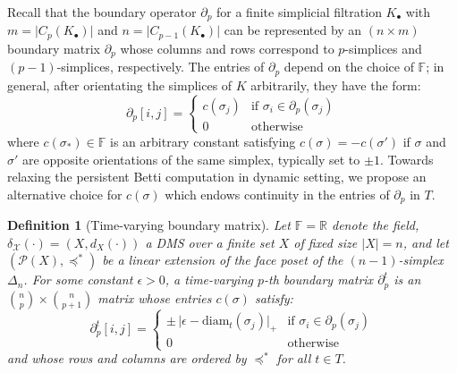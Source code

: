 \documentclass[10pt]{article}
\newtheorem{definition}{Definition}
\begin{document}
Recall that the boundary operator $\partial_p$ for a finite simplicial filtration $K_{\bullet}$ with $m = \lvert C_p(K_{\bullet}) \rvert$ and $n = \lvert C_{p-1}(K_{\bullet}) \rvert$ can be represented by an $(n \times m)$ boundary matrix $\partial_p$ whose columns and rows correspond to $p$-simplices and $(p-1)$-simplices, respectively. The entries of $\partial_p$ depend on the choice of $\mathbb{F}$; in general, after orientating the simplices of $K$ arbitrarily, they have the form: 
\begin{equation}\label{eq:matrix_pchain}
	\partial_p[i, j] = \begin{cases} 
	c(\sigma_j)  & \text{if } \sigma_i \in \partial_p(\sigma_j) \\
	0 & \text{otherwise}
   \end{cases}
\end{equation}
where $c(\sigma_\ast) \in \mathbb{F}$ is an arbitrary constant satisfying $c(\sigma) = -c(\sigma')$ if $\sigma$ and $\sigma'$ are opposite orientations of the same simplex, typically set to $\pm 1$.  Towards relaxing the persistent Betti computation in dynamic setting, we propose an alternative choice for $c(\sigma)$ which endows continuity in the entries of $\partial_p$ in $T$.
\begin{definition}[Time-varying boundary matrix]\label{def:time_boundary_matrix}
Let $\mathbb{F} = \mathbb{R}$ denote the field, $\delta_{\mathcal{X}}(\cdot) = (X, d_X(\cdot))$ a DMS over a finite set $X$ of fixed size $\lvert X \rvert = n$, and let $(\mathcal{P}(X), \preceq^\ast)$ be a linear extension of the face poset of the $(n-1)$-simplex $\Delta_n$. For some constant $\epsilon > 0$, a time-varying $p$-th boundary matrix $\partial_p^t$ is an $\binom{n}{p} \times \binom{n}{p+1}$ matrix whose entries $c(\sigma)$ satisfy:
$$
\partial_p^t[i,j] = \begin{cases}
	\pm \, \lvert \epsilon - \mathrm{diam}_t(\sigma_j) \rvert_{+} & \text{if } \sigma_i \in \partial_p(\sigma_j)\\
	0 & \text{otherwise}
\end{cases} 
$$
and whose rows and columns are ordered by $\preceq^\ast$ for all $t \in T$.%
\end{definition}
\end{document}
